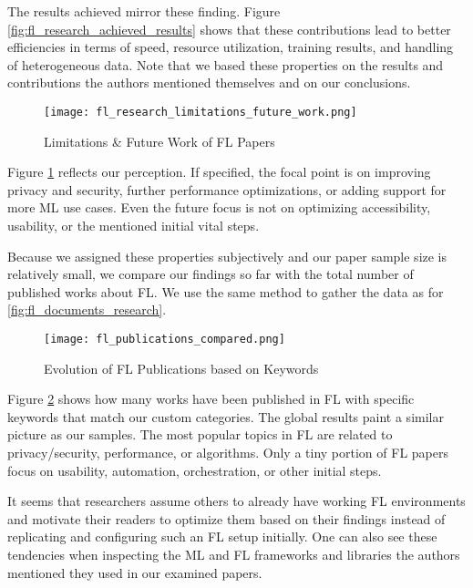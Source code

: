 The results achieved mirror these finding.
Figure \ref{fig:fl_research_achieved_results} shows that these contributions
lead to better efficiencies in terms of speed, resource utilization, training results,
and handling of heterogeneous data.
Note that we based these properties on the results and contributions the authors mentioned themselves
and on our conclusions.

\begin{figure}[h]
    \centering
    \texttt{[image: fl\_research\_limitations\_future\_work.png]}
    \caption{Limitations \& Future Work of FL Papers}
    \label{fig:fl_research_limitations_future_work}
\end{figure}

Figure \ref{fig:fl_research_limitations_future_work} reflects our perception.
If specified, the focal point is on improving privacy and security, further performance optimizations, or adding support for more ML use cases.
Even the future focus is not on optimizing accessibility, usability, or the mentioned initial vital steps.

Because we assigned these properties subjectively and our paper sample size is relatively small,
we compare our findings so far with the total number of published works about FL.
We use the same method to gather the data as for \ref{fig:fl_documents_research}.

\begin{figure}[h]
    \centering
    \texttt{[image: fl\_publications\_compared.png]}
    \caption{Evolution of FL Publications based on Keywords}
    \label{fig:fl_publications_compared}
\end{figure}


Figure \ref{fig:fl_publications_compared} shows how many works have been published in FL with
specific keywords that match our custom categories.
The global results paint a similar picture as our samples.
The most popular topics in FL are related to privacy/security, performance,
or algorithms.
Only a tiny portion of FL papers focus on usability, automation, orchestration,
or other initial steps.

It seems that researchers assume others to already have working FL environments
and motivate their readers to optimize them based on their findings
instead of replicating and configuring such an FL setup initially.
One can also see these tendencies when inspecting the ML and FL frameworks and libraries
the authors mentioned they used in our examined papers.

